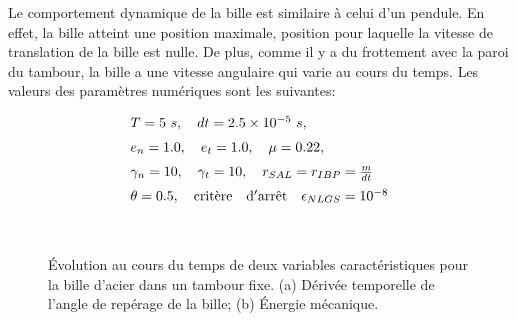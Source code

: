 Le comportement dynamique de la bille est similaire à celui d'un pendule. En effet, la bille atteint une position maximale, position pour laquelle la vitesse de translation de la bille est nulle. De plus, comme il y a du frottement avec la paroi du tambour, la bille a une vitesse angulaire qui varie au cours du temps. Les valeurs des paramètres numériques sont les suivantes:

\begin{eqnarray*}
	\begin{array}{l}
	    T = 5\ s,\quad dt = 2.5\times10^{-5}\ s, \nonumber \\[2mm]
		e_n = 1.0,\quad e_t = 1.0,\quad \mu = 0.22, \nonumber \\[2mm]
		\gamma_n = 10,\quad \gamma_t = 10, \quad r_{SAL} = r_{IBP} =  \frac{m}{dt} \nonumber  \\[2mm]
		\theta = 0.5,\quad {\rm crit\grave{e}re \quad d'arr\hat{e}t} \quad \epsilon_{NLGS} = 10^{-8}
	\end{array}
\end{eqnarray*}

\begin{figure}[h!]
\hspace{\fill}
   \\
\caption{\label{slide_roll_drum}Évolution au cours du temps de deux variables caractéristiques pour la bille d'acier dans un tambour fixe. (a) Dérivée temporelle de l'angle de repérage de la bille; (b) Énergie mécanique.}
\end{figure}

